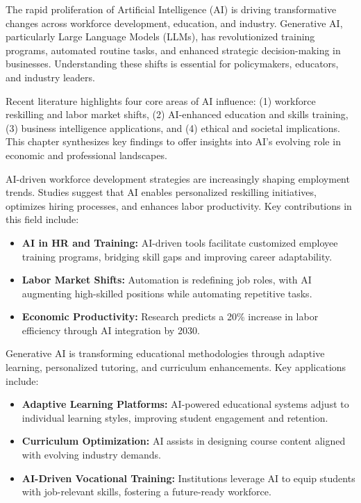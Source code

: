 \documentclass[a4paper,headinclude=on,footinclude=on,12pt,oneside]{scrbook}
\begin{document}

The rapid proliferation of Artificial Intelligence (AI) is driving transformative changes across workforce development, education, and industry. Generative AI, particularly Large Language Models (LLMs), has revolutionized training programs, automated routine tasks, and enhanced strategic decision-making in businesses. Understanding these shifts is essential for policymakers, educators, and industry leaders.

Recent literature highlights four core areas of AI influence: (1) workforce reskilling and labor market shifts, (2) AI-enhanced education and skills training, (3) business intelligence applications, and (4) ethical and societal implications. This chapter synthesizes key findings to offer insights into AI’s evolving role in economic and professional landscapes.


AI-driven workforce development strategies are increasingly shaping employment trends. Studies suggest that AI enables personalized reskilling initiatives, optimizes hiring processes, and enhances labor productivity. Key contributions in this field include:
\begin{itemize}
	\item \textbf{AI in HR and Training:} AI-driven tools facilitate customized employee training programs, bridging skill gaps and improving career adaptability.
	\item \textbf{Labor Market Shifts:} Automation is redefining job roles, with AI augmenting high-skilled positions while automating repetitive tasks.
	\item \textbf{Economic Productivity:} Research predicts a 20\% increase in labor efficiency through AI integration by 2030.
\end{itemize}


Generative AI is transforming educational methodologies through adaptive learning, personalized tutoring, and curriculum enhancements. Key applications include:
\begin{itemize}
	\item \textbf{Adaptive Learning Platforms:} AI-powered educational systems adjust to individual learning styles, improving student engagement and retention.
	\item \textbf{Curriculum Optimization:} AI assists in designing course content aligned with evolving industry demands.
	\item \textbf{AI-Driven Vocational Training:} Institutions leverage AI to equip students with job-relevant skills, fostering a future-ready workforce.
\end{itemize}
\end{document}
